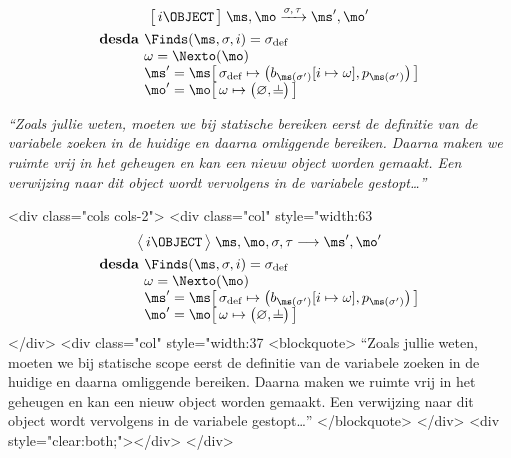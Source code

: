 \begin{htmlskip}
  \begin{multicols}{2}
    \small
    \raggedcolumns
    \setlength{\columnseprule}{.5pt}
    \begin{minipage}{.25\textwidth}\vspace*{-1.1pc}%
\begin{gather*}
  \Terminates{i \OBJECT}
    {\ms, \mo}
    {\sigma, \tau}
    {\ms', \mo'} \\
  \begin{array}{r@{}l}%
    \textbf{desda } & \Finds(\ms, \sigma, i) = \sigma_\text{def} \\
    & \omega = \Nexto(\mo) \\
    & \ms' = \ms \surr{ \sigma_\text{def} \mapsto \big(b_{\ms(\sigma')}[i\mapsto \omega], p_{\ms(\sigma')}\big) } \\
    & \mo' = \mo \surr{ \omega \mapsto \big(\varnothing, \nil\big) }
  \end{array}
\end{gather*}%
    \end{minipage}
    
    \columnbreak
    
    \textit{“Zoals jullie weten, moeten we bij statische bereiken eerst de definitie van de variabele zoeken in de huidige en daarna omliggende bereiken. Daarna maken we ruimte vrij in het geheugen en kan een nieuw object worden gemaakt. Een verwijzing naar dit object wordt vervolgens in de variabele gestopt\dots”}
  \end{multicols}
\end{htmlskip}
\begin{htmlonly}
  <div class="cols cols-2">
    <div class="col" style="width:63%
      \begin{gather*}
        \Config{i \OBJECT}{\ms, \mo, \sigma, \tau}
        \longrightarrow
        \ms', \mo' \\
        \begin{array}{r@{}l}%
          \textbf{desda } & \Finds(\ms, \sigma, i) = \sigma_\text{def} \\
          & \omega = \Nexto(\mo) \\
          & \ms' = \ms \surr{ \sigma_\text{def} \mapsto \big(b_{\ms(\sigma')}[i\mapsto \omega], p_{\ms(\sigma')}\big) } \\
          & \mo' = \mo \surr{ \omega \mapsto \big(\varnothing, \nil\big) }
        \end{array}
      \end{gather*}
    </div>
    <div class="col" style="width:37%
      <blockquote>
        “Zoals jullie weten, moeten we bij statische scope eerst de definitie van de variabele zoeken in de huidige
        en daarna omliggende bereiken. Daarna maken we ruimte vrij in het geheugen en kan een nieuw object worden gemaakt.
        Een verwijzing naar dit object wordt vervolgens in de variabele gestopt…”
      </blockquote>
    </div>
    <div style="clear:both;"></div>
  </div>
\end{htmlonly}

